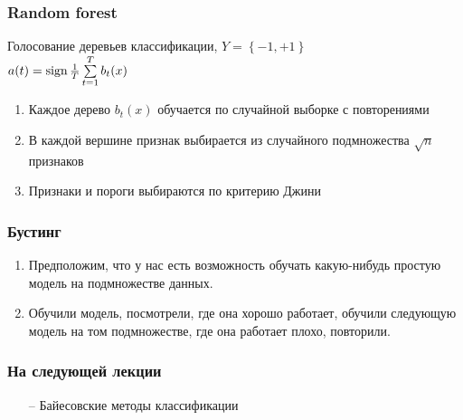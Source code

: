 \documentclass[12pt]{beamer}
\begin{document}
\begin{frame}\frametitle{Random forest}
Голосование деревьев классификации, $Y = \left\{ -1, +1 \right\}$\\
$a(t) = \operatorname{sign} \frac{1}{T} \sum\limits_{t=1}^T b_t(x)$\\
\begin{enumerate}[--]
\item Каждое дерево $b_t(x)$ обучается по случайной выборке с повторениями
\item В каждой вершине признак выбирается из случайного подмножества $\sqrt{n}$ признаков
\item Признаки и пороги выбираются по критерию Джини
\end{enumerate}
\end{frame}

\begin{frame}\frametitle{Бустинг}
\begin{enumerate} [--]
\item Предположим, что у нас есть возможность обучать какую-нибудь простую модель на подмножестве данных.
\item Обучили модель, посмотрели, где она хорошо работает, обучили следующую модель на том подмножестве, где она работает плохо, повторили.
\end{enumerate}
\end{frame}


\begin{frame}\frametitle{На следующей лекции}
\begin{itemize}
\item[--] Байесовские методы классификации
\end{itemize}
\end{frame}
\end{document}
